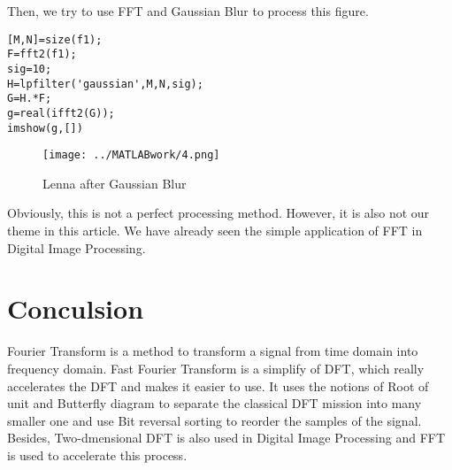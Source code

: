 \documentclass[12pt,a4paper]{article}
\begin{document}
Then, we try to use FFT and Gaussian Blur to process this figure.
\lstset{language=MATLAB}
\begin{lstlisting}
[M,N]=size(f1);
F=fft2(f1);
sig=10;
H=lpfilter('gaussian',M,N,sig);
G=H.*F;
g=real(ifft2(G));
imshow(g,[])
\end{lstlisting} 

\begin{figure}[hbtp]
\centering
\texttt{[image: ../MATLABwork/4.png]}
\caption{Lenna after Gaussian Blur}
\end{figure}

Obviously, this is not a perfect processing method. However, it is also not our theme in this article. We have already seen the simple application of FFT in Digital Image Processing.

\newpage
\section{Conculsion}
Fourier Transform is a method to transform a signal from time domain into frequency domain. Fast Fourier Transform is a simplify of DFT, which really accelerates the DFT and makes it easier to use. It uses the notions of Root of unit and Butterfly diagram to separate the classical DFT mission into many smaller one and use Bit reversal sorting to reorder the samples of the signal. Besides, Two-dmensional DFT is also used in Digital Image Processing and FFT is used to accelerate this process. 



\end{document}
